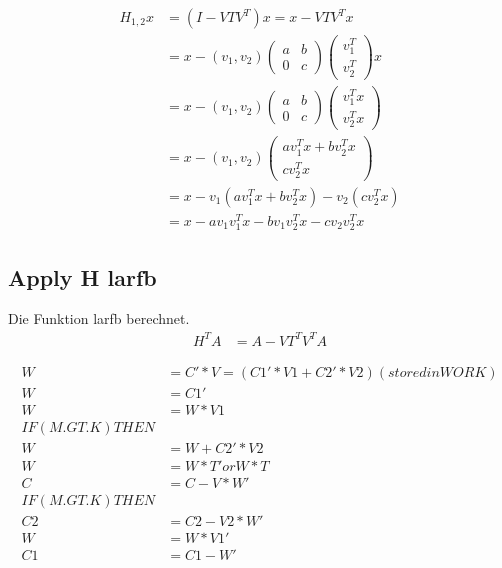 \begin{align*}
  H_{1,2} x &= (I - V T V^T) x = x - V T V^T x\\
  &= x - (v_1, v_2)
  \begin{pmatrix}
    a & b \\ 0 & c
  \end{pmatrix}
  \begin{pmatrix}
    v_1^T \\ v_2^T 
  \end{pmatrix}
  x\\
  &= x - (v_1, v_2)
  \begin{pmatrix}
    a & b \\ 0 & c
  \end{pmatrix}
  \begin{pmatrix}
    v_1^T x \\ v_2^T x
  \end{pmatrix}\\
  &= x - (v_1, v_2)
  \begin{pmatrix}
    a v_1^T x + b v_2^T x\\  c v_2^T x
  \end{pmatrix}\\
  &= x - v_1(a v_1^T x + b v_2^T x) - v_2 (c v_2^T x)\\
  &= x - a v_1 v_1^T x - b v_1 v_2^T x - c v_2 v_2^T x
\end{align*}

\subsection{Apply H larfb}
Die Funktion larfb berechnet.
\begin{align}
	H^T A &= A - V T^T V^T A
\end{align}

\begin{align*}
	W &= C' * V  =  (C1'*V1 + C2'*V2)  (stored in WORK)\\
	W &= C1'\\
	W &= W * V1\\
	IF( M.GT.K ) THEN\\
	W &= W + C2'*V2\\
	W &= W * T'  or  W * T\\
	C &= C - V * W'\\
	IF( M.GT.K ) THEN\\
	C2 &= C2 - V2 * W'\\
	W &= W * V1'\\
	C1 &= C1 - W'\\
\end{align*}


